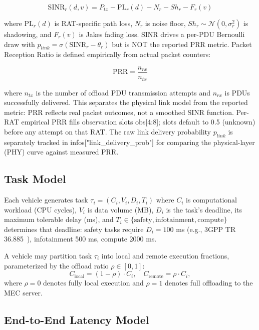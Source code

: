 \documentclass[journal,10pt,twocolumn]{IEEEtran}
\begin{document}
\begin{equation}
\label{eq:sinr}
\text{SINR}_r(d,v) = P_{tx} - \text{PL}_r(d) - N_r - Sh_r - F_r(v)
\end{equation}

where $\text{PL}_r(d)$ is RAT-specific path loss, $N_r$ is noise floor, $Sh_r \sim \mathcal{N}(0,\sigma^2_r)$ is shadowing, and $F_r(v)$ is Jakes fading loss. SINR drives a per-PDU Bernoulli draw with $p_{link} = \sigma(\text{SINR}_r - \theta_r)$ but is NOT the reported PRR metric. Packet Reception Ratio is defined empirically from actual packet counters:

\begin{equation}
\label{eq:prr}
\text{PRR} = \frac{n_{rx}}{n_{tx}}
\end{equation}

where $n_{tx}$ is the number of offload PDU transmission attempts and $n_{rx}$ is PDUs successfully delivered. This separates the physical link model from the reported metric: PRR reflects real packet outcomes, not a smoothed SINR function. Per-RAT empirical PRR fills observation slots obs[4:8]; slots default to 0.5 (unknown) before any attempt on that RAT. The raw link delivery probability $p_{link}$ is separately tracked in infos["link\_delivery\_prob"] for comparing the physical-layer (PHY) curve against measured PRR.

\subsection{Task Model}

Each vehicle generates task $\tau_i = (C_i, V_i, D_i, T_i)$ where $C_i$ is computational workload (CPU cycles), $V_i$ is data volume (MB), $D_i$ is the task's deadline, its maximum tolerable delay (ms), and $T_i \in \{\text{safety}, \text{infotainment}, \text{compute}\}$ determines that deadline: safety tasks require $D_i = 100$ ms (e.g., 3GPP TR 36.885~\cite{molina2017}), infotainment 500 ms, compute 2000 ms.

A vehicle may partition task $\tau_i$ into local and remote execution fractions, parameterized by the offload ratio $\rho \in [0, 1]$:
\begin{equation}
\label{eq:offload_ratio}
C_{\text{local}} = (1 - \rho) \cdot C_i, \quad C_{\text{remote}} = \rho \cdot C_i,
\end{equation}
where $\rho = 0$ denotes fully local execution and $\rho = 1$ denotes full offloading to the MEC server.

\subsection{End-to-End Latency Model}
\end{document}
